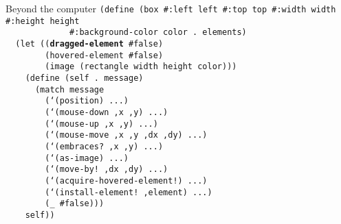 \begin{frame}{Beyond the computer}
  \tiny
  \texttt{(define (box \#:left left \#:top top \#:width width \#:height height\\
    \ \ \ \ \ \ \ \ \ \ \ \ \ \#:background-color color .\ elements)\\
    \ \ (let ((\textbf{dragged-element} \#false)\\
    \ \ \ \ \ \ \ \ (hovered-element \#false)\\
    \ \ \ \ \ \ \ \ (image (rectangle width height color)))\\
    \ \ \ \ (define (self .\ message)\\
    \ \ \ \ \ \ (match message\\
    \ \ \ \ \ \ \ \ (`(position) ...)\\
    \ \ \ \ \ \ \ \ (`(mouse-down ,x ,y) ...)\\
    \ \ \ \ \ \ \ \ (`(mouse-up ,x ,y) ...)\\
    \ \ \ \ \ \ \ \ (`(mouse-move ,x ,y ,dx ,dy) ...)\\
    \ \ \ \ \ \ \ \ (`(embraces?\ ,x ,y) ...)\\
    \ \ \ \ \ \ \ \ (`(as-image) ...)\\
    \ \ \ \ \ \ \ \ (`(move-by!\ ,dx ,dy) ...)\\
    \ \ \ \ \ \ \ \ (`(acquire-hovered-element!) ...)\\
    \ \ \ \ \ \ \ \ (`(install-element!\ ,element) ...)\\
    \ \ \ \ \ \ \ \ (\_ \#false)))\\
    \ \ \ \ self))} \\
  \ \\ \ \\ \ \\ \ \\ \ \\ \ \\ \ \\ \ \\ \ \\ \ \\ \ 
\end{frame}

